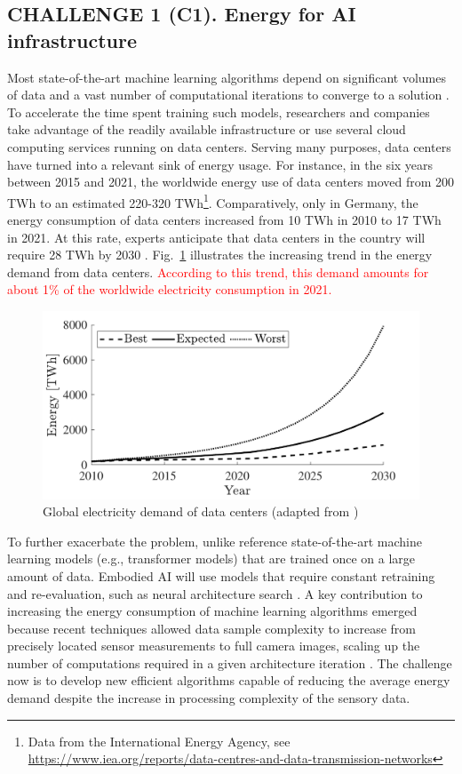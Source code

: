 \subsection{\textbf{CHALLENGE 1} (C1). Energy for AI infrastructure}
Most state-of-the-art machine learning algorithms depend on significant volumes of data and a vast number of computational iterations to converge to a solution \cite{Strubell2019EnergyAP}. To accelerate the time spent training such models, researchers and companies take advantage of the readily available infrastructure or use several cloud computing services running on data centers. Serving many purposes, data centers have turned into a relevant sink of energy usage.  For instance, in the six years between 2015 and 2021, the worldwide energy use of data centers moved from 200 TWh to an estimated 220-320 TWh\footnote{Data from the International Energy Agency, see \url{https://www.iea.org/reports/data-centres-and-data-transmission-networks}}. Comparatively, only in Germany, the energy consumption of data centers increased from 10 TWh in 2010 to 17 TWh in 2021. At this rate, experts anticipate that data centers in the country will require 28 TWh by 2030 \cite{Hintemann2022Cloudcomputingdrives}. Fig.~\ref{fig:dataCenterEnergy} illustrates the increasing trend in the energy demand from data centers. \textcolor{red}{According to this trend, this demand amounts for about 1\% of the worldwide electricity consumption in 2021.}
\begin{figure}[!t]
	\centering
	\includegraphics[width=0.9\columnwidth]{fig/data_center_energy_consumption.pdf}
	\caption{Global electricity demand of data centers (adapted from \cite{andrae2015global})}
	\label{fig:dataCenterEnergy}
\end{figure}
To further exacerbate the problem, unlike reference state-of-the-art machine learning models (e.g., transformer models) that are trained once on a large amount of data. Embodied AI will use models that require constant retraining and re-evaluation, such as neural architecture search \cite{real2019regularized}. A key contribution to increasing the energy consumption of machine learning algorithms emerged because recent techniques allowed data sample complexity to increase from precisely located sensor measurements to full camera images, scaling up the number of computations required in a given architecture iteration \cite{krizhevsky2012imagenet}. The challenge now is to develop new efficient algorithms capable of reducing the average energy demand despite the increase in processing complexity of the sensory data.


